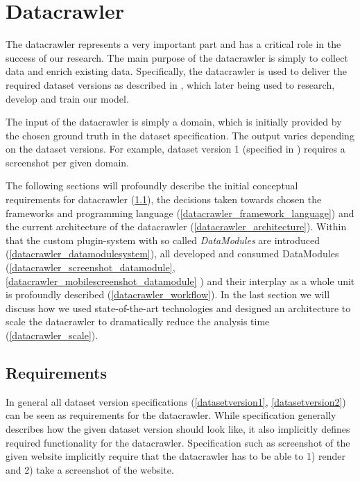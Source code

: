 \section{Datacrawler}
\label{Datacrawler}
The datacrawler represents a very important part and has a critical role in the success of our research. The main purpose of the datacrawler is simply to collect data and enrich existing data. Specifically, the datacrawler is used to deliver the required dataset versions as described in \label{dataset} , which later being used to research, develop and train our model.

The input of the datacrawler is simply a domain, which is initially provided by the chosen ground truth in the dataset specification. The output varies depending on the dataset versions. For example, dataset version 1 (specified in \label{datasetversion1})  requires a screenshot per given domain.

The following sections will profoundly describe the initial conceptual requirements for datacrawler (\ref{datacrawler_requirements}), the decisions taken towards chosen the frameworks and programming language (\ref{datacrawler_framework_language}) and the current architecture of the datacrawler (\ref{datacrawler_architecture}). Within that the custom plugin-system with so called \textit{DataModules} are introduced (\ref{datacrawler_datamodulesystem}), all developed and consumed DataModules (\ref{datacrawler_screenshot_datamodule}, \ref{datacrawler_mobilescreenshot_datamodule} ) and their interplay as a whole unit is profoundly described (\ref{datacrawler_workflow}).  In the last section we will discuss how we used state-of-the-art technologies and designed an architecture to scale the datacrawler to dramatically reduce the analysis time (\ref{datacrawler_scale}).

\subsection{Requirements}
\label{datacrawler_requirements}
In general all dataset version specifications (\ref{datasetversion1}, \ref{datasetversion2}) can be seen as requirements for the datacrawler. While specification generally describes how the given dataset version should look like, it also implicitly defines required functionality for the datacrawler. Specification such as screenshot of the given website implicitly require that the datacrawler has to be able to 1) render and 2) take a screenshot of the website.

